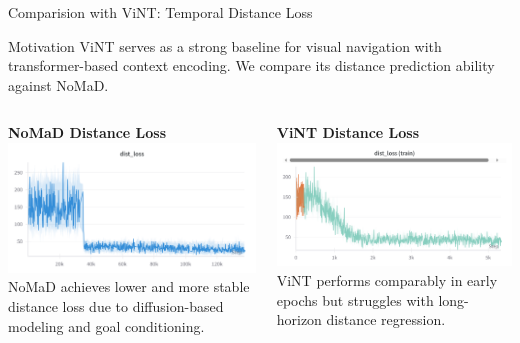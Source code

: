 \documentclass{beamer}
\begin{document}
\begin{frame}{Comparision with ViNT: Temporal Distance Loss}
        \begin{block}{Motivation}
            ViNT serves as a strong baseline for visual navigation with transformer-based context encoding. We compare its distance prediction ability against NoMaD.
        \end{block}
    
        \begin{columns}
            \begin{column}{0.48\textwidth}
                \begin{block}{\centering \small \textbf{NoMaD Distance Loss}}
                    \centering
                    \includegraphics[width=\textwidth]{images/dist_loss.png}
                    \tiny NoMaD achieves lower and more stable distance loss due to diffusion-based modeling and goal conditioning.
                \end{block}
            \end{column}
    
            \begin{column}{0.48\textwidth}
                \begin{block}{\centering \small \textbf{ViNT Distance Loss}}
                    \centering
                    \includegraphics[width=\textwidth]{images/dist_loss (train).png}
                    \tiny ViNT performs comparably in early epochs but struggles with long-horizon distance regression.
                \end{block}
            \end{column}
        \end{columns}
    

\end{frame}
\end{document}

